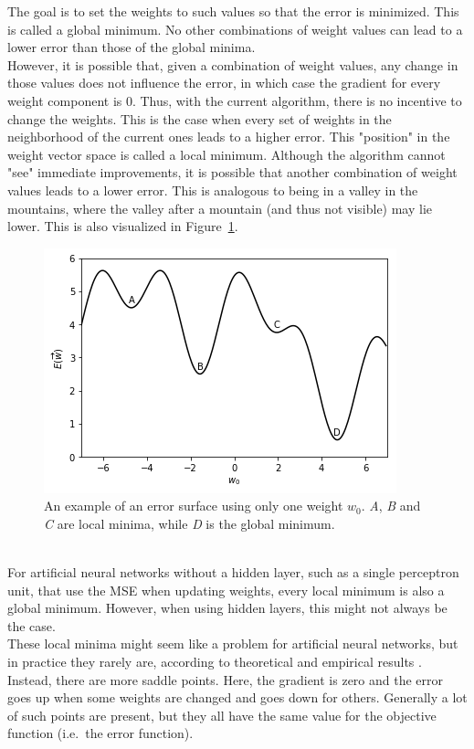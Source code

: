 The goal is to set the weights to such values so that the error is minimized.
This is called a global minimum.
No other combinations of weight values can lead to a lower error than those of the global minima.\\
However, it is possible that, given a combination of weight values, any change in those values does not influence the error, in which case the gradient for every weight component is $0$.
Thus, with the current algorithm, there is no incentive to change the weights.
This is the case when every set of weights in the neighborhood of the current ones leads to a higher error. This "position" in the weight vector space is called a local minimum.
Although the algorithm cannot "see" immediate improvements, it is possible that another combination of weight values leads to a lower error.
This is analogous to being in a valley in the mountains, where the valley after a mountain (and thus not visible) may lie lower.
This is also visualized in Figure~\ref{fig:error_surface}.
\begin{figure}[htb]
    \centering
    \includegraphics[width=.8\linewidth]{images/error_surface.png}
    \caption[An example of an error surface]{An example of an error surface using only one weight $w_0$. \textit{A}, \textit{B} and \textit{C} are local minima, while \textit{D} is the global minimum.}
    \label{fig:error_surface}
\end{figure}\\

For artificial neural networks without a hidden layer, such as a single perceptron unit, that use the MSE when updating weights, every local minimum is also a global minimum.
However, when using hidden layers, this might not always be the case.\\
These local minima might seem like a problem for artificial neural networks, but in practice they rarely are, according to theoretical and empirical results \parencite{DBLP:journals/corr/ChoromanskaHMAL14}.
Instead, there are more saddle points.
Here, the gradient is zero and the error goes up when some weights are changed and goes down for others.
Generally a lot of such points are present, but they all have the same value for the objective function (i.e.\ the error function).\\

